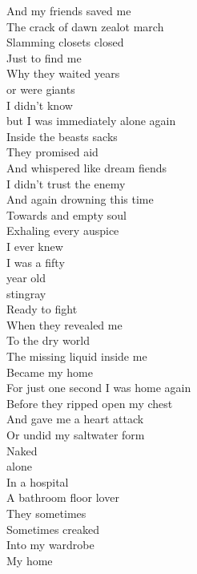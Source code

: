 And my friends saved me\\
The crack of dawn zealot march\\
Slamming closets closed\\
Just to find me\\

Why they waited years\\
or were giants\\
I didn't know\\
but I was immediately alone again\\

Inside the beasts sacks\\
They promised aid\\
And whispered like dream fiends\\
I didn't trust the enemy\\

And again drowning this time\\
Towards and empty soul\\
Exhaling every auspice\\
I ever knew\\

I was a fifty\\
year old\\
stingray\\
Ready to fight\\

When they revealed me\\
To the dry world\\
The missing liquid inside me\\
Became my home\\

For just one second I was home again\\
Before they ripped open my chest\\
And gave me a heart attack\\
Or undid my saltwater form\\

Naked\\
alone\\
In a hospital\\
A bathroom floor lover\\

They sometimes\\
Sometimes creaked\\
Into my wardrobe\\
My home\\

